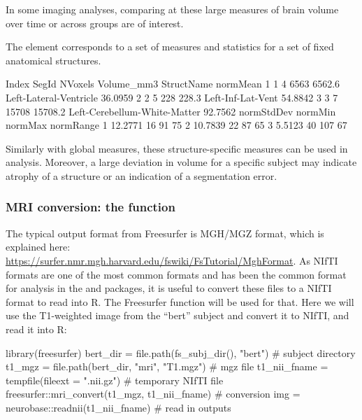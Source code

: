 In some imaging analyses, comparing at these large measures of brain volume over time or across groups are of interest.  

The  element corresponds to a set of measures and statistics for a set of fixed anatomical structures.

\begin{Schunk}
\begin{Soutput}
  Index SegId NVoxels Volume_mm3                   StructName normMean
1     1     4    6563     6562.6       Left-Lateral-Ventricle  36.0959
2     2     5     228      228.3            Left-Inf-Lat-Vent  54.8842
3     3     7   15708    15708.2 Left-Cerebellum-White-Matter  92.7562
  normStdDev normMin normMax normRange
1    12.2771      16      91        75
2    10.7839      22      87        65
3     5.5123      40     107        67
\end{Soutput}
\end{Schunk}

Similarly with global measures, these structure-specific measures can be
used in analysis. Moreover, a large deviation in volume for a specific
subject may indicate atrophy of a structure or an indication of a
segmentation error.

\subsubsection{\texorpdfstring{MRI conversion: the 
function}{MRI conversion: the  function}}\label{mri-conversion-the-function}

The typical output format from Freesurfer is MGH/MGZ format, which is
explained here:
\url{https://surfer.nmr.mgh.harvard.edu/fswiki/FsTutorial/MghFormat}. As
NIfTI formats are one of the most common formats and has been the common
format for analysis in the  and  packages,
it is useful to convert these files to a NIfTI format to read into R.
The  Freesurfer function will be used for that. Here
we will use the T1-weighted image from the ``bert'' subject and convert
it to NIfTI, and read it into R:

\begin{Schunk}
\begin{Sinput}
library(freesurfer)
bert_dir = file.path(fs_subj_dir(), "bert") # subject directory
t1_mgz = file.path(bert_dir, "mri", "T1.mgz") # mgz file
t1_nii_fname = tempfile(fileext = ".nii.gz") # temporary NIfTI file
freesurfer::mri_convert(t1_mgz, t1_nii_fname) # conversion
img = neurobase::readnii(t1_nii_fname) # read in outputs
\end{Sinput}
\end{Schunk}

